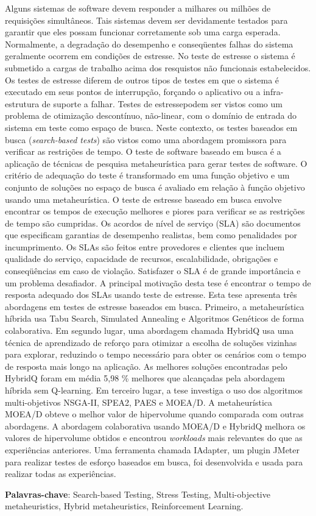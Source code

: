 
\begin{resumo} 
 
Alguns sistemas de software devem responder a milhares ou milhões de requisições simultâneos. Tais sistemas devem ser devidamente testados para garantir que eles possam funcionar corretamente sob uma carga esperada. Normalmente, a degradação do desempenho e conseqüentes falhas do sistema geralmente ocorrem em condições de estresse. No teste de estresse o sistema é submetido a cargas de trabalho acima dos resquistos não funcionais estabelecidos. Os testes de estresse diferem de outros tipos de testes em que o sistema é executado em seus pontos de interrupção, forçando o aplicativo ou a infra-estrutura de suporte a falhar. Testes de estressepodem ser vistos como um problema de otimização descontínuo, não-linear, com o domínio de entrada do sistema em teste como espaço de busca. Neste contexto, os testes baseados em busca (\textit{search-based tests}) são vistos como uma abordagem promissora para verificar as restrições de tempo. O teste de software baseado em busca é a aplicação de técnicas de pesquisa metaheurística para gerar testes de software. O critério de adequação do teste é transformado em uma função objetivo e um conjunto de soluções no espaço de busca é avaliado em relação à função objetivo usando uma metaheurística. O teste de estresse baseado em busca envolve encontrar os tempos de execução melhores e piores para verificar se as restrições de tempo são cumpridas. Os acordos de nível de serviço (SLA) são documentos que especificam garantias de desempenho realistas, bem como penalidades por incumprimento. Os SLAs são feitos entre provedores e clientes que incluem qualidade do serviço, capacidade de recursos, escalabilidade, obrigações e conseqüências em caso de violação. Satisfazer o SLA é de grande importância e um problema desafiador. A principal motivação desta tese é encontrar o tempo de resposta adequado dos SLAs usando teste de estresse. Esta tese apresenta três abordagens em testes de estresse baseados em busca. Primeiro, a metaheurística híbrida usa Tabu Search, Simulated Annealing e Algoritmos Genéticos de forma colaborativa. Em segundo lugar, uma abordagem chamada HybridQ usa uma técnica de aprendizado de reforço para otimizar a escolha de soluções vizinhas para explorar, reduzindo o tempo necessário para obter os cenários com o tempo de resposta mais longo na aplicação. As melhores soluções encontradas pelo HybridQ foram em média 5,98 \% melhores que alcançadas pela abordagem híbrida sem Q-learning. Em terceiro lugar, a tese investiga o uso dos algoritmos multi-objetivos NSGA-II, SPEA2, PAES e MOEA/D. A metaheurística MOEA/D obteve o melhor valor de hipervolume quando comparada com outras abordagens. A abordagem colaborativa usando MOEA/D e HybridQ melhora os valores de hipervolume obtidos e encontrou \textit{workloads} mais relevantes do que as experiências anteriores. Uma ferramenta chamada IAdapter, um plugin JMeter para realizar testes de esforço baseados em busca, foi desenvolvida e usada para realizar todas as experiências.

\textbf{Palavras-chave}: Search-based Testing, Stress Testing, Multi-objective metaheuristics, Hybrid metaheuristics, Reinforcement Learning.

\end{resumo}

